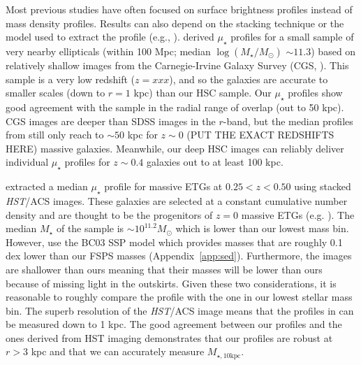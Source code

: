 \documentclass[a4paper,fleqn,usenatbib]{mnras}
\def\mstar{{$M_{\star}$}}
\def\logms{{$\log (M_{\star}/M_{\odot})$}}
\def\minn{{$M_{\star,10\mathrm{kpc}}$}}
\def\mden{{$\mu_{\star}$}}
\begin{document}
Most previous studies have often focused on surface brightness profiles instead of mass density profiles.  Results can also depend on the stacking technique or the model  used to extract the profile (e.g., \citealt{Tal2011, DSouza2015}). \citet{Huang2013a} derived \mden{} profiles for a small sample of very nearby 
    ellipticals (within 100 Mpc; median \logms{} ${\sim} 11.3$) based on relatively shallow 
    images from the Carnegie-Irvine Galaxy Survey (CGS, \citealt{CGS1}).  This sample is a very low redshift ($z=xxx$), and so the \citet{Huang2013a} galaxies are accurate to  smaller scales (down to $r=1$ kpc) than our HSC sample.  Our \mden{} profiles show good agreement with the \citet{Huang2013a} sample in the radial range of overlap (out to 50 kpc). CGS images are deeper than SDSS images in the $r$-band, but the median 
    profiles from \citet{Huang2013a} still only reach to ${\sim} 50$ kpc for $z{\sim} 0$ (PUT THE EXACT REDSHIFTS HERE)
    massive galaxies.
    Meanwhile, our deep HSC images can reliably deliver individual \mden{} profiles 
    for $z{\sim} 0.4$ galaxies out to at least 100 kpc.  
    
    \citet{Patel2013} extracted a median \mden{} profile for massive ETGs at 
    $0.25 < z < 0.50$ using stacked \textit{HST}/ACS images. 
    These galaxies are selected at a constant cumulative number density and are 
    thought to be the progenitors of $z=0$ massive ETGs (e.g. \citealt{Leja2013}).  
    The median \mstar{} of the \citet{Patel2013} sample is 
    ${\sim} 10^{11.2} M_{\odot}$ which is lower than our lowest mass bin. 
    However, \citet{Patel2013} use the BC03 SSP model which provides masses that are roughly 0.1 dex 
    lower than our FSPS masses (Appendix~\ref{app:sed}). 
    Furthermore, the \citet{Patel2013} images are shallower than ours meaning 
    that their masses will be lower than ours because of missing light in the 
    outskirts. 
    Given these two considerations, it is reasonable to roughly compare the 
    \citet{Patel2013} profile with the one in our lowest stellar mass bin. 
    The superb resolution of the \textit{HST}/ACS image means that the profiles in
    \citet{Patel2013} can be measured down to 1 kpc. 
    The good agreement between our profiles and the ones derived from HST imaging demonstrates that our profiles are robust at $r > 3$ kpc and that we can accurately 
    measure \minn{}.
    
\end{document}
